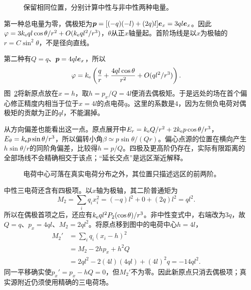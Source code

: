 \begin{figure}[H]\centering
{}
\caption{保留相同位置，分别计算中性与非中性两种电量。}\label{fig:es2-e3-q}
\end{figure}
\begin{solution}
第一种总电量为零，偶极矩为$\bm{p}=[(-q)(-l)+(2q)l]\bm{e}_x=3ql\bm{e}_x$。因此$\varphi=3k_{\rm e} ql\cos\theta/r^2+O(k_{\rm e} ql^2/r^3)$，$\theta$从正$x$轴量起。首阶场线是以$x$为极轴的$r=C\sin^2\theta$，不是径向直线。

第二种有$Q=q$、$\bm{p}=4ql\bm{e}_x$，所以
\[\varphi=k_{\rm e}\left(\frac qr+\frac{4ql\cos\theta}{r^2}+O(ql^2/r^3)\right).
\]
图~\ref{fig:es2-e3-s}将新原点放在$x=h$，取$h=p_x/Q=4l$便消去偶极矩。于是远处的场在首个偏心修正精度内相当于位于$x=4l$的点电荷$q$。这里的系数是$4$，因为左侧负电荷对偶极矩的贡献为正的$ql$，不能漏掉。

从方向偏差也能看出这一点。原点展开中$E_r=k_{\rm e} Q/r^2+2k_{\rm e} p\cos\theta/r^3$，$E_\theta=k_{\rm e} p\sin\theta/r^3$，所以偏转小角$\beta\simeq p\sin\theta/(Qr)$。偏心点源的位置在横向产生$h\sin\theta/r$的同阶角偏差，比较得$h=p/Q$。四极及更高阶仍存在，实际有限距离的全部场线不会精确相交于该点；“延长交点”是远区渐近解释。
\begin{figure}[H]\centering
{}
\caption{电荷中心可落在真实电荷分布之外，其位置只描述远区的前两阶。}\label{fig:es2-e3-s}
\end{figure}


中性三电荷还含有四极项。以$x$轴为极轴，其二阶普通矩为
\[M_2=\sum_iq_ix_i^2=(-q)l^2+0+(2q)l^2=ql^2.
\]
所以在偶极首项之后，还应有$k_{\rm e} ql^2P_2(\cos\theta)/r^3$。非中性变式中，右端改为$3q$，故$Q=q$、$p_x=4ql$、$M_2=2ql^2$。将原点移到图中的电荷中心$h=4l$，
\[\begin{aligned}
M_2'&=\sum_iq_i(x_i-h)^2\\
&=M_2-2hp_x+h^2Q\\
&=2ql^2-2(4l)(4ql)+(4l)^2q=-14ql^2.
\end{aligned}\]
同一平移确实使$p_x'=p_x-hQ=0$，但$M_2'$不为零。因此新原点只消去偶极项；真实源附近仍须使用精确的三电荷场。\end{solution}

